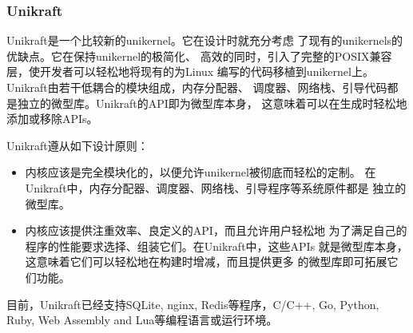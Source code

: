 \documentclass{../runikraft-report}
\begin{document}
\subsubsection{Unikraft}
Unikraft是一个比较新的unikernel。它在设计时就充分考虑
了现有的unikernels的优缺点。它在保持unikernel的极简化、
高效的同时，引入了完整的POSIX兼容层，使开发者可以轻松地将现有的为Linux
编写的代码移植到unikernel上。Unikraft由若干低耦合的模块组成，内存分配器、
调度器、网络栈、引导代码都是独立的微型库。Unikraft的API即为微型库本身，
这意味着可以在生成时轻松地添加或移除APIs。\cite{bib:unikraft}

Unikraft遵从如下设计原则：
\begin{itemize}
\item 内核应该是完全模块化的，以便允许unikernel被彻底而轻松的定制。
在Unikraft中，内存分配器、调度器、网络栈、引导程序等系统原件都是
独立的微型库。
\item 内核应该提供注重效率、良定义的API，而且允许用户轻松地
为了满足自己的程序的性能要求选择、组装它们。在Unikraft中，这些APIs
就是微型库本身，这意味着它们可以轻松地在构建时增减，而且提供更多
的微型库即可拓展它们功能。
\end{itemize}

目前，Unikraft已经支持SQLite, nginx, Redis等程序，C/C++, Go, Python, Ruby,
Web Assembly and Lua等编程语言或运行环境。
\end{document}
